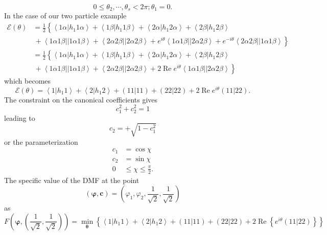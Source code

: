 \documentclass[aps,preprint]{revtex4}%
\begin{document}
\[
0\leq\theta_{2},\cdots,\theta_{s}<2\pi;\theta_{1}=0.
\]
In the case of our two particle example
\begin{align*}
\mathcal{E}\left(  \theta\right)   &  =\frac{1}{2}\left\{  \overset
{}{\left\langle 1\alpha\left\vert h_{1}1\alpha\right.  \right\rangle
+\left\langle 1\beta\left\vert h_{1}1\beta\right.  \right\rangle +\left\langle
2\alpha\left\vert h_{1}2\alpha\right.  \right\rangle +\left\langle
2\beta\left\vert h_{1}2\beta\right.  \right\rangle }\right.  \\
&  \left.  \,+\left\langle 1\alpha1\beta\right\vert \left\vert 1\alpha
1\beta\right\rangle +\left\langle 2\alpha2\beta\right\vert \left\vert
2\alpha2\beta\right\rangle +e^{i\theta}\left\langle 1\alpha1\beta\right\vert
\left\vert 2\alpha2\beta\right\rangle +e^{-i\theta}\left\langle 2\alpha
2\beta\right\vert \left\vert 1\alpha1\beta\right\rangle \overset{}{}\right\}
\\
&  =\frac{1}{2}\left\{  \overset{}{\left\langle 1\alpha\left\vert h_{1}%
1\alpha\right.  \right\rangle +\left\langle 1\beta\left\vert h_{1}%
1\beta\right.  \right\rangle +\left\langle 2\alpha\left\vert h_{1}%
2\alpha\right.  \right\rangle +\left\langle 2\beta\left\vert h_{1}%
2\beta\right.  \right\rangle }\right.  \\
&  \left.  \,+\left\langle 1\alpha1\beta\right\vert \left\vert 1\alpha
1\beta\right\rangle +\left\langle 2\alpha2\beta\right\vert \left\vert
2\alpha2\beta\right\rangle +2\operatorname{Re}e^{i\theta}\left\langle
1\alpha1\beta\right\vert \left\vert 2\alpha2\beta\right\rangle \overset{}%
{}\right\}
\end{align*}
which becomes%
\[
\mathcal{E}\left(  \theta\right)  =\left\langle 1\left\vert h_{1}1\right.
\right\rangle +\left\langle 2\left\vert h_{1}2\right.  \right\rangle +\left(
\left.  11\right\vert 11\right)  +\left(  \left.  22\right\vert 22\right)
+2\operatorname{Re}e^{i\theta}\left(  \left.  11\right\vert 22\right)  .
\]
The constraint on the canonical coefficients gives
\[
c_{1}^{2}+c_{2}^{2}=1
\]
leading to
\[
c_{2}=+\sqrt{1-c_{1}^{2}}%
\]
or the parameterization
\begin{align*}
c_{1} &  =\cos\chi\\
c_{2} &  =\sin\chi\\
0 &  \leq\chi\leq\frac{\pi}{2}.
\end{align*}
The specific value of the DMF at the point
\[
\left(  \mathbf{\varphi,c}\right)  =\left(  \varphi_{1},\varphi_{2},\frac
{1}{\sqrt{2}},\frac{1}{\sqrt{2}}\right)
\]
as
\[
F\left(  \mathbf{\varphi,}\left(  \frac{1}{\sqrt{2}},\frac{1}{\sqrt{2}%
}\right)  \right)  =\min_{\mathbf{\theta}}\left\{  \left\langle 1\left\vert
h_{1}1\right.  \right\rangle +\left\langle 2\left\vert h_{1}2\right.
\right\rangle +\left(  \left.  11\right\vert 11\right)  +\left(  \left.
22\right\vert 22\right)  +2\operatorname{Re}\left\{  e^{i\theta}\left(
\left.  11\right\vert 22\right)  \right\}  \right\}
\]
\end{document}

